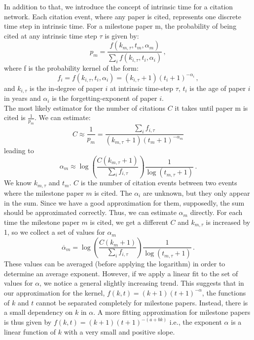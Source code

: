 \documentclass[fleqn,10pt]{wlscirep}
\begin{document}
In addition to that, we introduce the concept of intrinsic time for a citation network. Each citation event, where any paper is cited, represents one discrete time step in intrinsic time. For a milestone paper m, the probability of being cited at any intrinsic time step $\tau$ is given by:
%
\begin{equation}
    p_m = \frac{f(k_{m, \tau}, t_m, \alpha_m)}{\sum_i f(k_{i, \tau}, t_i, \alpha_i)} \, ,
\end{equation}
%
where f is the probability kernel of the form:
%
\begin{equation}
    f_i = f(k_{i, \tau}, t_i, \alpha_i) = (k_{i, \tau}+1)(t_i + 1)^{-\alpha_i} \, , 
\end{equation}
%
and $k_{i, \tau}$ is the in-degree of paper $i$ at intrinsic time-step $\tau$, $t_i$ is the age of paper $i$ in years and $\alpha_i$ is the forgetting-exponent of paper $i$.\\
The most likely estimator for the number of citations $C$ it takes until paper m is cited is $\frac{1}{p_m}$. We can estimate:
%
\begin{equation}
    C \approx \frac{1}{p_m} = \frac{\sum_i f_{i, \tau}}{(k_{m, \tau}+1)(t_m + 1)^{-\alpha_m}}
\end{equation}
%
leading to 
%
\begin{equation}
\label{eq_alpha}
    \alpha_m \approx \log(\frac{C (k_{m, \tau}+1)}{\sum_i f_{i, \tau}}) \frac{1}{\log(t_{m, \tau}+1)} \, .
\end{equation}
%
We know $k_{m, \tau}$ and  $t_{m}$. $C$ is the number of citation events between two events where the milestone paper $m$ is cited. 
The $\alpha_i$ are unknown, but they only appear in the sum. Since we have a good approximation for them, supposedly, the sum should be approximated correctly. Thus, we can estimate $\alpha_m$ directly. For each time the milestone paper $m$ is cited, we get a different $C$ and $k_{m, \tau}$ is increased by 1, so we collect a set of values for $\alpha_m$
%
\begin{equation}
\label{eq:msalpha}
    \overline{\alpha}_m = \log(\frac{C(k_m+1)}{\sum_i f_{i, \tau}})\frac{1}{\log(t_{m, \tau}+1)} \, . 
\end{equation}
%
These values can be averaged (before applying the logarithm) in order to determine an average exponent. However, if we apply a linear fit to the set of values for $\alpha$, we notice a general slightly increasing trend. This suggests that in our approximation for the kernel, $f(k,t) = (k+1)(t + 1)^{-\alpha}$, the functions of $k$ and $t$ cannot be separated completely for milestone papers. Instead, there is a small dependency on $k$ in $\alpha$. A more fitting approximation for milestone papers is thus given by $f(k,t) = (k+1)(t + 1)^{-(a+bk)}$ i.e., the exponent $\alpha$ is a linear function of $k$ with a very small and positive slope.
\end{document}
